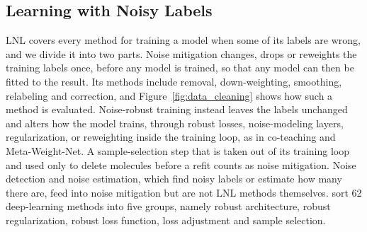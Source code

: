 \subsection{Learning with Noisy Labels}\label{sec:lnl_background}

LNL covers every method for training a model when some of its labels are wrong, and we divide it into two parts. Noise mitigation changes, drops or reweights the training labels once, before any model is trained, so that any model can then be fitted to the result. Its methods include removal, down-weighting, smoothing, relabeling and correction, and Figure~\ref{fig:data_cleaning} shows how such a method is evaluated. Noise-robust training instead leaves the labels unchanged and alters how the model trains, through robust losses, noise-modeling layers, regularization, or reweighting inside the training loop, as in co-teaching and Meta-Weight-Net. A sample-selection step that is taken out of its training loop and used only to delete molecules before a refit counts as noise mitigation. Noise detection and noise estimation, which find noisy labels or estimate how many there are, feed into noise mitigation but are not LNL methods themselves. \citet{Song2022} sort 62 deep-learning methods into five groups, namely robust architecture, robust regularization, robust loss function, loss adjustment and sample selection.


